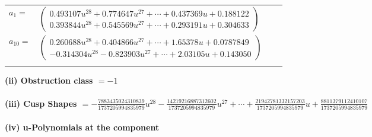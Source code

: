 \documentclass[1p]{elsarticle_modified}
\theoremstyle{definition}
\begin{document}
\begin{tabular}{m{7pt} m{180pt} m{7pt} m{180pt} }
\flushright $a_{1}=$&$\begin{pmatrix}0.493107 u^{28}+0.774647 u^{27}+\cdots+0.437369 u+0.188122\\0.393844 u^{28}+0.545569 u^{27}+\cdots+0.293191 u+0.304633\end{pmatrix}$ \\
\flushright $a_{10}=$&$\begin{pmatrix}0.260688 u^{28}+0.404866 u^{27}+\cdots+1.65378 u+0.0787849\\-0.314304 u^{28}-0.823903 u^{27}+\cdots+2.03105 u+0.143050\end{pmatrix}$\\&\end{tabular}
\flushleft \textbf{(ii) Obstruction class $= -1$}\\~\\
\flushleft \textbf{(iii) Cusp Shapes $= -\frac{7883435024310839}{1737205994835979} u^{28}-\frac{14219216887312602}{1737205994835979} u^{27}+\cdots+\frac{21942781332157203}{1737205994835979} u+\frac{8811379112410107}{1737205994835979}$}\\~\\
\newpage\renewcommand{\arraystretch}{1}
\flushleft \textbf{(iv) u-Polynomials at the component}\newline \\
\end{document}
